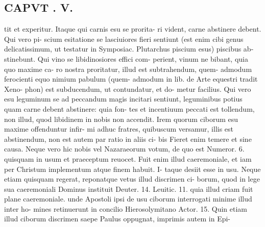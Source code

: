 \documentclass{article}
\begin{document}
\begin{pages}
\section*{CAPVT . V. }
\marginpar{[ p.277 ]}tit et experitur. Itaque qui carnis esu se prorita- ri vident, carne abstinere debent. Qui vero pi- scium esitatione se lasciuiores fieri sentiunt (est enim cibi genus delicatissimum, ut testatur in Symposiac. Plutarchus piscium esus) piscibus ab- stinebunt. Qui vino se libidinosiores effici com- perient, vinum ne bibant, quia quo maxime ca- ro nostra proritatur, illud est subtrahendum, quem- admodum ferocienti equo nimium pabulum (quem- admodum in lib. de Arte equestri tradit Xeno- phon) est subducendum, ut contundatur, et do- metur facilius. Qui vero esu leguminum se ad peccandum magis incitari sentiunt, leguminibus potius quam carne debent abstinere: quia fon- tes et incentiuum peccati est tollendum, non illud, quod libidinem in nobis non accendit. Irem quorum ciborum esu maxime offenduntur infir- mi adhuc fratres, quibuscum versamur, illis est abstinendum, non est autem par ratio in aliis ci- bis Fieret enim temere et sine causa. Neque vero hic nobis vel Nazaraeorum votum, de quo est Numeror. 6. quisquam in usum et praeceptum reuocet. Fuit enim illud caeremoniale, et iam per Christum implementum atque finem habuit. I- taque desiit esse in usu. Neque etiam quisquam regerat, reponatque vetus illud discrimen ci- borum, quod in lege sua caeremoniali Dominus instituit Deuter. 14. Leuitic. 11. quia illud criam fuit plane caeremoniale. unde Apostoli ipsi de usu ciborum interrogati minime illud inter ho- mines retinuerunt in concilio Hierosolymitano Actor. 15. Quin etiam illud ciborum discrimen saepe Paulus oppugnat, imprimis autem in Epi- 

\end{pages}
\end{document}
